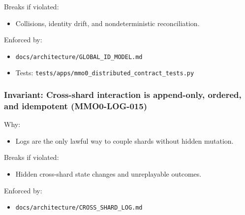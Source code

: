 \documentclass[9pt,a4paper,openany]{book}
\begin{document}
Breaks if violated:



\begin{itemize}
\item Collisions, identity drift, and nondeterministic reconciliation.\allowbreak{}
\end{itemize}


Enforced by:



\begin{itemize}
\item \texttt{docs/\allowbreak{}architecture/\allowbreak{}GLOBAL\_\allowbreak{}ID\_\allowbreak{}MODEL.\allowbreak{}md}
\end{itemize}


\begin{itemize}
\item Tests: \texttt{tests/\allowbreak{}apps/\allowbreak{}mmo0\_\allowbreak{}distributed\_\allowbreak{}contract\_\allowbreak{}tests.\allowbreak{}py}
\end{itemize}





\subsubsection{Invariant: Cross-shard interaction is append-only, ordered, and idempotent (MMO0-LOG-015)}


Why:



\begin{itemize}
\item Logs are the only lawful way to couple shards without hidden mutation.\allowbreak{}
\end{itemize}


Breaks if violated:



\begin{itemize}
\item Hidden cross-\allowbreak{}shard state changes and unreplayable outcomes.\allowbreak{}
\end{itemize}


Enforced by:



\begin{itemize}
\item \texttt{docs/\allowbreak{}architecture/\allowbreak{}CROSS\_\allowbreak{}SHARD\_\allowbreak{}LOG.\allowbreak{}md}
\end{itemize}
\end{document}
